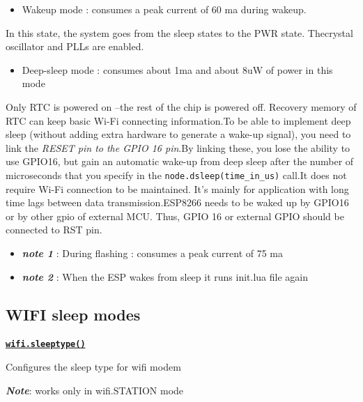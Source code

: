 \documentclass[16pt]{article}
\begin{document}
\begin{itemize}

\item
  Wakeup mode : consumes a peak current of 60 ma during wakeup.
\end{itemize}

In this state, the system goes from the sleep states to the PWR state.
Thecrystal oscillator and PLLs are enabled.

\begin{itemize}

\item
  Deep-sleep mode : consumes about 1ma and about 8uW of power in this
  mode
\end{itemize}

Only RTC is powered on --the rest of the chip is powered off. Recovery
memory of RTC can keep basic Wi-Fi connecting information.To be able to implement deep sleep (without adding extra hardware to
generate a wake-up signal), you need to link the \emph{RESET pin to the
GPIO 16 pin}.By linking these, you lose the ability to use GPIO16, but
gain an automatic wake-up from deep sleep after the number of
microseconds that you specify in the \texttt{node.dsleep(time\_in\_us)}
call.It does not require Wi-Fi connection to be maintained. It's mainly for
application with long time lags between data transmission.ESP8266 needs to be waked up by GPIO16 or by other gpio of external MCU.
Thus, GPIO 16 or external GPIO should be connected to RST pin.

\begin{itemize}

\item
  \textbf{\emph{note 1}} : During flashing : consumes a peak current of 75
  ma
\item
  \textbf{\emph{note 2}} : When the ESP wakes from sleep it runs init.lua file again
\end{itemize}

\vspace{0.5cm}
\subsection{WIFI sleep modes}

\vspace{0.5cm}
{\underline{\texttt{\textbf{wifi.sleeptype()}}}}


\vspace{0.1cm}
  Configures the sleep type for wifi modem


\textbf{\emph{Note}}: works only in wifi.STATION mode
\end{document}
